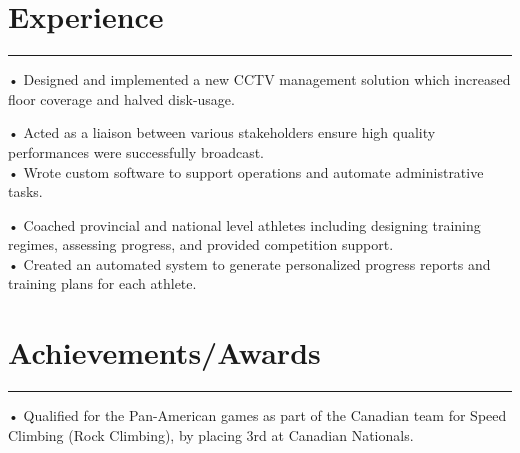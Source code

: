\documentclass[]{rahulworld-resume}
\begin{document}
\begin{minipage}[t]{0.66\textwidth}
\section{Experience}
\noindent\rule{12.5cm}{0.4pt}
 
\noindent
\hspace{3em}%
\begin{minipage}{0.85\textwidth\vspace{2pt}}
• Designed and implemented a new CCTV management solution which increased floor coverage and halved disk-usage.
\end{minipage}
\sectionsep

 
\noindent
\hspace{3em}%
\begin{minipage}{0.85\textwidth\vspace{2pt}}
• Acted as a liaison between various stakeholders ensure high quality performances were successfully broadcast.\\
• Wrote custom software to support operations and automate administrative tasks.
\end{minipage}
\sectionsep

 
\noindent
\hspace{3em}%
\begin{minipage}{0.85\textwidth\vspace{2pt}}
• Coached provincial and national level athletes including designing training regimes, assessing progress, and provided competition support.\\
• Created an automated system to generate personalized progress reports and training plans for each athlete.
\end{minipage}
\sectionsep

\section{Achievements/Awards} 
\noindent\rule{12.5cm}{0.4pt}
 
\descript{}
\noindent
\hspace{3em}%
\begin{minipage}{0.85\textwidth\vspace{2pt}}
• Qualified for the Pan-American games as part of the Canadian team for Speed Climbing (Rock Climbing), by placing 3rd at Canadian Nationals. 
\end{minipage}
\sectionsep


\end{minipage}
\end{document}
